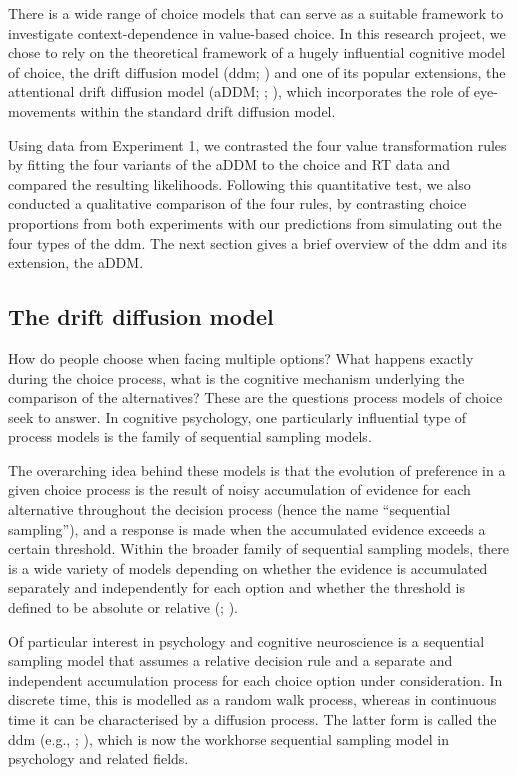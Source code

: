 \documentclass[11pt,a4paper]{article}
\begin{document}
There is a wide range of choice models that can serve as a suitable framework to investigate context-dependence in value-based choice. In this research project, we chose to rely on the theoretical framework of a hugely influential cognitive model of choice, the drift diffusion model (ddm; ) and one of its popular extensions, the attentional drift diffusion model (aDDM; ; ), which incorporates the role of eye-movements within the standard drift diffusion model. 

Using data from Experiment 1, we contrasted the four value transformation rules by fitting the four variants of the aDDM to the choice and RT data and compared the resulting likelihoods. Following this quantitative test, we also conducted a qualitative comparison of the four rules, by contrasting choice proportions from both experiments with our predictions from simulating out the four types of the ddm. The next section gives a brief overview of the ddm and its extension, the aDDM.



\subsection{The drift diffusion model} \label{chap1addmexplain}


How do people choose when facing multiple options? What happens exactly during the choice process, what is the cognitive mechanism underlying the comparison of the alternatives? These are the questions process models of choice seek to answer. In cognitive psychology, one particularly influential type of process models is the family of sequential sampling models. 

The overarching idea behind these models is that the evolution of preference in a given choice process is the result of noisy accumulation of evidence for each alternative throughout the decision process (hence the name “sequential sampling”), and a response is made when the accumulated evidence exceeds a certain threshold. Within the broader family of sequential sampling models, there is a wide variety of models depending on whether the evidence is accumulated separately and independently for each option and whether the threshold is defined to be absolute or relative (; ).

Of particular interest in psychology and cognitive neuroscience is a sequential sampling model that assumes a relative decision rule and a separate and independent accumulation process for each choice option under consideration. In discrete time, this is modelled as a random walk process, whereas in continuous time it can be characterised by a diffusion process. The latter form is called the ddm (e.g., ; ), which is now the workhorse sequential sampling model in psychology and related fields. 
\end{document}
